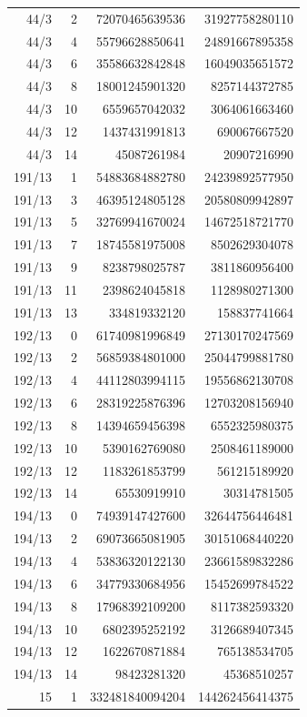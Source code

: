 \begin{longtable}{@{}rrrr@{}}
44/3 & 2 & 72070465639536 & 31927758280110\\
44/3 & 4 & 55796628850641 & 24891667895358\\
44/3 & 6 & 35586632842848 & 16049035651572\\
44/3 & 8 & 18001245901320 & 8257144372785\\
44/3 & 10 & 6559657042032 & 3064061663460\\
44/3 & 12 & 1437431991813 & 690067667520\\
44/3 & 14 & 45087261984 & 20907216990\\
191/13 & 1 & 54883684882780 & 24239892577950\\
191/13 & 3 & 46395124805128 & 20580809942897\\
191/13 & 5 & 32769941670024 & 14672518721770\\
191/13 & 7 & 18745581975008 & 8502629304078\\
191/13 & 9 & 8238798025787 & 3811860956400\\
191/13 & 11 & 2398624045818 & 1128980271300\\
191/13 & 13 & 334819332120 & 158837741664\\
192/13 & 0 & 61740981996849 & 27130170247569\\
192/13 & 2 & 56859384801000 & 25044799881780\\
192/13 & 4 & 44112803994115 & 19556862130708\\
192/13 & 6 & 28319225876396 & 12703208156940\\
192/13 & 8 & 14394659456398 & 6552325980375\\
192/13 & 10 & 5390162769080 & 2508461189000\\
192/13 & 12 & 1183261853799 & 561215189920\\
192/13 & 14 & 65530919910 & 30314781505\\
194/13 & 0 & 74939147427600 & 32644756446481\\
194/13 & 2 & 69073665081905 & 30151068440220\\
194/13 & 4 & 53836320122130 & 23661589832286\\
194/13 & 6 & 34779330684956 & 15452699784522\\
194/13 & 8 & 17968392109200 & 8117382593320\\
194/13 & 10 & 6802395252192 & 3126689407345\\
194/13 & 12 & 1622670871884 & 765138534705\\
194/13 & 14 & 98423281320 & 45368510257\\
15 & 1 & 332481840094204 & 144262456414375\\

\end{longtable}
